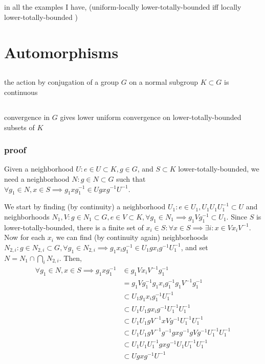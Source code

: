 \documentclass[a4paper]{article}
\newcommand{\inv }{^{-1}}
\begin{document}
\subsection{} in all the examples I have, (uniform-locally lower-totally-bounded iff locally lower-totally-bounded )
\section{Automorphisms}
\subsection{} the action by conjugation of a group $G$ on a normal subgroup $K\subset G$ is continuous
\subsection{} convergence in $G$ gives lower uniform convergence on lower-totally-bounded subsets of $K$
\subsubsection{proof} Given a neighborhood $U:e\in U\subset K, g\in G$, and $S\subset K$ lower-totally-bounded, we need a neighborhood $N:g\in N\subset G$ such that $\forall g_1\in N,x\in S\implies g_1 x g_1\inv \in Ugxg\inv U\inv $.

We start by finding (by continuity) a neighborhood $U_1:e\in U_1, U_1 U_1 U_1\inv \subset U$ and neighborhoods $N_1,V:g\in N_1\subset G,e\in V\subset K,\forall g_1\in N_1\implies g_1 V g_1\inv \subset U_1$. Since $S$ is lower-totally-bounded, there is a finite set of $x_i\in S:\forall x\in S\implies \exists i:x\in Vx_iV\inv $. Now for each $x_i$ we can find (by continuity again) neighborhoods $N_{2,i}:g\in N_{2,i}\subset G,\forall g_1\in N_{2,i}\implies g_1 x_i g_1\inv \in U_1 g x_i g\inv U_1\inv $, and set $N=N_1\cap \bigcap_i N_{2,i}$. Then, \begin{equation*}\begin{split}\forall g_1\in N,x\in S\implies g_1 x g_1\inv &\in g_1 V x_i V\inv g_1\inv \\ &=g_1 V g_1\inv g_1 x_i g_1\inv g_1 V\inv g_1\inv \\&\subset U_1 g_1 x_i g_1\inv U_1\inv \\&\subset U_1 U_1 g x_i g\inv U_1\inv U_1\inv \\&\subset U_1 U_1 g V\inv x V g\inv U_1\inv U_1\inv \\&\subset U_1 U_1 g V\inv g\inv g x g\inv g V g\inv U_1\inv U_1\inv \\&\subset U_1 U_1 U_1\inv g x g\inv U_1 U_1\inv U_1\inv \\&\subset U g x g\inv U\inv \end{split}\end{equation*}
\end{document}
